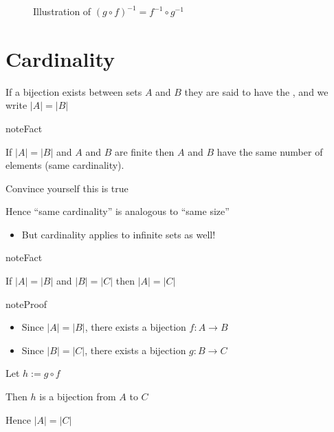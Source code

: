 \documentclass[letterpaper,10pt,english]{jupyterBook}
\begin{document}
\begin{figure}[htbp]
\centering
\capstart

\noindent{}
\caption{Illustration of \((g \circ f)^{-1} = f^{-1} \circ g^{-1}\)}\label{\detokenize{03.set_theory:bij-inv}}\end{figure}


\section{Cardinality}
\label{\detokenize{03.set_theory:cardinality}}
\sphinxAtStartPar
If a bijection exists between sets \(A\) and \(B\) they are said to have the , and we write \(|A| = |B|\)

\begin{sphinxadmonition}{note}{Fact}

\sphinxAtStartPar
If \(|A| = |B|\) and \(A\) and \(B\) are finite then \(A\) and \(B\) have the same number of elements (same cardinality).
\end{sphinxadmonition}

\sphinxAtStartPar
{} Convince yourself this is true

\sphinxAtStartPar
Hence “same cardinality” is analogous to “same size”
\begin{itemize}
\item {} 
\sphinxAtStartPar
But cardinality applies to infinite sets as well!

\end{itemize}

\begin{sphinxadmonition}{note}{Fact}

\sphinxAtStartPar
If \(|A| = |B|\) and \(|B| = |C|\) then \(|A| = |C|\)
\end{sphinxadmonition}

\begin{sphinxadmonition}{note}{Proof}
\begin{itemize}
\item {} 
\sphinxAtStartPar
Since \(|A| = |B|\), there exists a bijection \(f \colon A \to B\)

\item {} 
\sphinxAtStartPar
Since \(|B| = |C|\), there exists a bijection \(g \colon B \to C\)

\end{itemize}

\sphinxAtStartPar
Let \(h := g \circ f\)

\sphinxAtStartPar
Then \(h\) is a bijection from \(A\) to \(C\)

\sphinxAtStartPar
Hence \(|A| = |C|\)
\end{sphinxadmonition}
\end{document}

